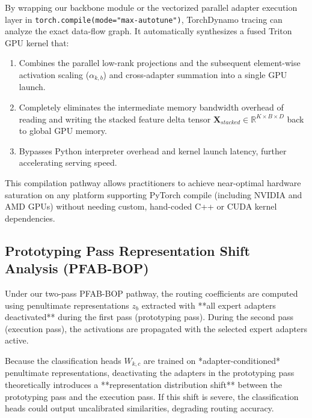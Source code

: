 \documentclass{article}
\theoremstyle{plain}
\theoremstyle{definition}
\theoremstyle{remark}
\begin{document}
By wrapping our backbone module or the vectorized parallel adapter execution layer in \texttt{torch.compile(mode="max-autotune")}, TorchDynamo tracing can analyze the exact data-flow graph. It automatically synthesizes a fused Triton GPU kernel that:
\begin{enumerate}
  \item Combines the parallel low-rank projections and the subsequent element-wise activation scaling ($\alpha_{k, b}$) and cross-adapter summation into a single GPU launch.
  \item Completely eliminates the intermediate memory bandwidth overhead of reading and writing the stacked feature delta tensor $\mathbf{X}_{stacked} \in \mathbb{R}^{K \times B \times D}$ back to global GPU memory.
  \item Bypasses Python interpreter overhead and kernel launch latency, further accelerating serving speed.
\end{enumerate}
This compilation pathway allows practitioners to achieve near-optimal hardware saturation on any platform supporting PyTorch compile (including NVIDIA and AMD GPUs) without needing custom, hand-coded C++ or CUDA kernel dependencies.

\subsection{Prototyping Pass Representation Shift Analysis (PFAB-BOP)}
Under our two-pass \textsc{PFAB-BOP} pathway, the routing coefficients are computed using penultimate representations $z_b$ extracted with **all expert adapters deactivated** during the first pass (prototyping pass). During the second pass (execution pass), the activations are propagated with the selected expert adapters active. 

Because the classification heads $W_{k,c}$ are trained on *adapter-conditioned* penultimate representations, deactivating the adapters in the prototyping pass theoretically introduces a **representation distribution shift** between the prototyping pass and the execution pass. If this shift is severe, the classification heads could output uncalibrated similarities, degrading routing accuracy.
\end{document}
